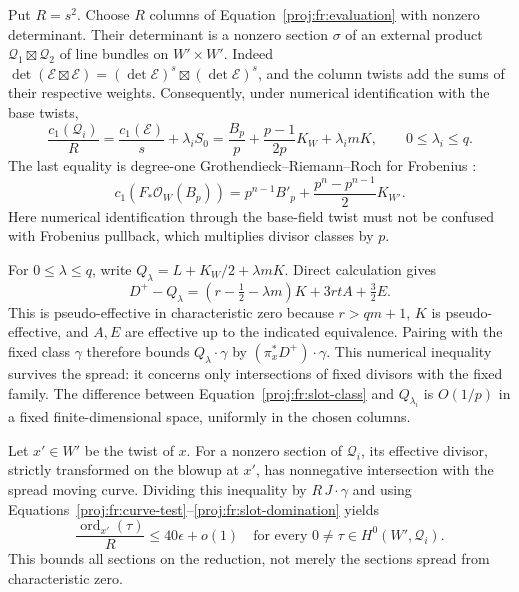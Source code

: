 \documentclass[11pt,letterpaper]{article}
\newcommand{\OO}{\mathcal{O}}
\DeclareMathOperator{\ord}{ord}
\theoremstyle{definition}
\theoremstyle{remark}
\begin{document}
Put \(R=s^2\). Choose \(R\) columns of
Equation~\eqref{proj:fr:evaluation} with nonzero determinant. Their
determinant is a nonzero section \(\sigma\) of an external product
\(\mathcal Q_1\boxtimes\mathcal Q_2\) of line bundles on \(W'\times W'\).
Indeed
\(\det(\mathcal E\boxtimes\mathcal E)
 =(\det\mathcal E)^s\boxtimes(\det\mathcal E)^s\),
and the column twists add the sums of their respective weights.
Consequently, under numerical identification with the base twists,
\begin{equation}
\label{proj:fr:slot-class}
 \frac{c_1(\mathcal Q_i)}{R}
   =\frac{c_1(\mathcal E)}s+\lambda_iS_0
   =\frac{B_p}{p}+\frac{p-1}{2p}K_W+\lambda_i mK,
 \qquad 0\leq\lambda_i\leq q.
\end{equation}
The last equality is degree-one Grothendieck--Riemann--Roch for
Frobenius \cite[Lemma~4.2]{Proj-Sun2008}:
\[
 c_1(F_*\OO_W(B_p))
   =p^{n-1}B'_p+\frac{p^n-p^{n-1}}2K_{W'}.
\]
Here numerical identification through the base-field twist must not
be confused with Frobenius pullback, which multiplies divisor classes
by \(p\).

For \(0\leq\lambda\leq q\), write
\(Q_\lambda=L+K_W/2+\lambda mK\). Direct calculation gives
\begin{equation}
\label{proj:fr:slot-domination}
 D^+-Q_\lambda
   =(r-\tfrac12-\lambda m)K+3rtA+\tfrac32E.
\end{equation}
This is pseudo-effective in characteristic zero because
\(r>qm+1\), \(K\) is pseudo-effective, and \(A,E\) are effective up
to the indicated equivalence. Pairing with the fixed class \(\gamma\)
therefore bounds \(Q_\lambda\cdot\gamma\) by
\((\pi_x^*D^+)\cdot\gamma\). This numerical inequality survives the
spread: it concerns only intersections of fixed divisors with the
fixed family. The difference between
Equation~\eqref{proj:fr:slot-class} and \(Q_{\lambda_i}\) is \(O(1/p)\)
in a fixed finite-dimensional space, uniformly in the chosen columns.

Let \(x'\in W'\) be the twist of \(x\). For a nonzero section of
\(\mathcal Q_i\), its effective divisor, strictly transformed on the
blowup at \(x'\), has nonnegative intersection with the spread moving
curve. Dividing this inequality by \(R\,J\cdot\gamma\) and using
Equations~\eqref{proj:fr:curve-test}--\eqref{proj:fr:slot-domination} yields
\begin{equation}
\label{proj:fr:slot-order}
 \frac{\ord_{x'}(\tau)}R\leq40\epsilon+o(1)
 \quad\text{for every }0\ne\tau\in H^0(W',\mathcal Q_i).
\end{equation}
This bounds all sections on the reduction, not merely the sections
spread from characteristic zero.
\end{document}

